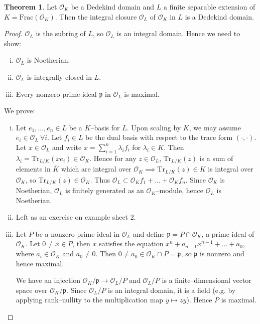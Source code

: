 \documentclass{article}
\theoremstyle{definition}
\newtheorem{theorem}{Theorem}[section]
\begin{document}
\begin{theorem}\label{theorem10.2}
    Let $\mathcal{O}_K$ be a Dedekind domain and $L$ a finite separable extension of $K = \text{Frac}(\mathcal{O}_K)$. Then the integral closure $\mathcal{O}_L$ of $\mathcal{O}_K$ in $L$ is a Dedekind domain. 
\end{theorem}
\begin{proof}
    $\mathcal{O}_L$ is the subring of $L$, so $\mathcal{O}_L$ is an integral domain. Hence we need to show:
    \begin{enumerate}[(i)]
        \item $\mathcal{O}_L$ is Noetherian.
        \item $\mathcal{O}_L$ is integrally closed in $L$.
        \item Every nonzero prime ideal $\mathfrak{p}$ in $\mathcal{O}_L$ is maximal.  
    \end{enumerate}
    We prove:
    \begin{enumerate}[(i)]
        \item Let $e_1,\ldots,e_n \in L$ be a $K$--basis for $L$. Upon scaling by $K$, we may assume $e_i \in \mathcal{O}_L ~\forall i$. Let $f_i \in L$ be the dual basis with respect to the trace form $(\cdot ,\cdot )$. Let $x \in \mathcal{O}_L$ and write $x = \sum_{i=1}^{n} \lambda_i f_i$ for $\lambda_i \in K$. Then $\lambda_i = \text{Tr}_{L/K}(x e_i) \in \mathcal{O}_K$. Hence for any $z \in \mathcal{O}_L$, $\text{Tr}_{L/K}(z)$ is a sum of elements in $\overline{K}$ which are integral over $\mathcal{O}_K \implies \text{Tr}_{L/K}(z) \in K$ is integral over $\mathcal{O}_K$, so $\text{Tr}_{L/K}(z) \in \mathcal{O}_K$. Thus $\mathcal{O}_L \subset \mathcal{O}_Kf_1 + \ldots + \mathcal{O}_Kf_n$. Since $\mathcal{O}_K$ is Noetherian, $\mathcal{O}_L$ is finitely generated as an $\mathcal{O}_K$--module, hence $\mathcal{O}_L$ is Noetherian.
        \item Left as an exercise on example sheet 2.
        \item Let $P$ be a nonzero prime ideal in $\mathcal{O}_L$ and define $\mathfrak{p} = P \cap \mathcal{O}_K$, a prime ideal of $\mathcal{O}_K$. Let $0 \neq x \in P$, then $x$ satisfies the equation $x^n + a_{n-1}x^{n-1}+ \ldots + a_0$, where $a_i \in \mathcal{O}_K$ and $a_0 \neq 0$. Then $0 \neq a_0 \in \mathcal{O}_K \cap P = \mathfrak{p}$, so $\mathfrak{p}$ is nonzero and hence maximal.
        \vspace{1mm}
         
        We have an injection $\mathcal{O}_K/\mathfrak{p} \to \mathcal{O}_L/P$ and $\mathcal{O}_L/P$ is a finite--dimensional vector space over $\mathcal{O}_K/\mathfrak{p}$. Since $\mathcal{O}_L/P$ is an integral domain, it is a field (e.g. by applying rank--nullity to the multiplication map $y \mapsto zy$). Hence $P$ is maximal.
    \end{enumerate}
\end{proof}
\end{document}
